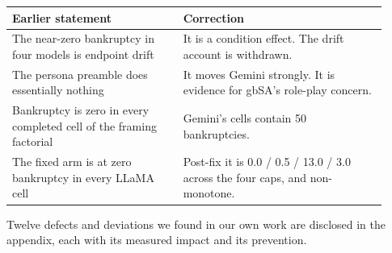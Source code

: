 \documentclass[11pt]{article}
\begin{document}
\begin{table}[h]
\centering
\small
\begin{tabular}{p{0.42\linewidth}p{0.50\linewidth}}
\toprule
\textbf{Earlier statement} & \textbf{Correction} \\
\midrule
The near-zero bankruptcy in four models is endpoint drift &
It is a condition effect. The drift account is withdrawn. \\
\addlinespace
The persona preamble does essentially nothing &
It moves Gemini strongly. It is evidence for gbSA's role-play concern. \\
\addlinespace
Bankruptcy is zero in every completed cell of the framing factorial &
Gemini's cells contain 50 bankruptcies. \\
\addlinespace
The fixed arm is at zero bankruptcy in every LLaMA cell &
Post-fix it is 0.0 / 0.5 / 13.0 / 3.0 across the four caps, and non-monotone. \\
\bottomrule
\end{tabular}
\end{table}

\noindent
Twelve defects and deviations we found in our own work are disclosed in the appendix, each with
its measured impact and its prevention.


\clearpage

\clearpage

\clearpage

\clearpage
\end{document}

